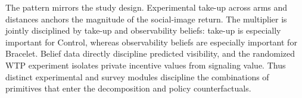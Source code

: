 \documentclass[12pt]{article}
\begin{document}
The pattern mirrors the study design. Experimental take-up across arms and
distances anchors the magnitude of the social-image return. The multiplier is
jointly disciplined by take-up and observability beliefs: take-up is
especially important for Control, whereas observability beliefs are especially
important for Bracelet. Belief data directly discipline predicted visibility,
and the randomized WTP experiment isolates private incentive values from
signaling value. Thus distinct experimental and survey modules discipline the
combinations of primitives that enter the decomposition and policy
counterfactuals.
\end{document}
